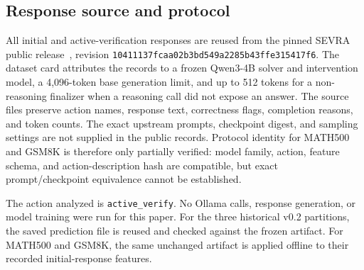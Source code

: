 \documentclass[conference]{IEEEtran}
\begin{document}
\subsection{Response source and protocol}
All initial and active-verification responses are reused from the pinned SEVRA public release~\cite{sevraoutcomes2026}, revision \texttt{10411137fcaa02b3bd549a2285b43ffe315417f6}. The dataset card attributes the records to a frozen Qwen3-4B solver and intervention model, a 4,096-token base generation limit, and up to 512 tokens for a non-reasoning finalizer when a reasoning call did not expose an answer. The source files preserve action names, response text, correctness flags, completion reasons, and token counts. The exact upstream prompts, checkpoint digest, and sampling settings are not supplied in the public records. Protocol identity for MATH500 and GSM8K is therefore only partially verified: model family, action, feature schema, and action-description hash are compatible, but exact prompt/checkpoint equivalence cannot be established.

The action analyzed is \texttt{active\_verify}. No Ollama calls, response generation, or model training were run for this paper. For the three historical v0.2 partitions, the saved prediction file is reused and checked against the frozen artifact. For MATH500 and GSM8K, the same unchanged artifact is applied offline to their recorded initial-response features.
\end{document}

